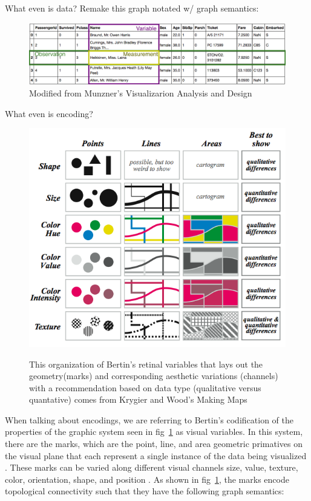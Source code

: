 \documentclass[letterpaper,onecolumn,titlepage]{Ythesis}
\begin{document}
 What even is data?
 Remake this graph notated w/ graph semantics:
 \begin{figure}
    \includegraphics{figures/intro/data_formatting}
    \caption{Modified from Munzner's Visualizarion Analysis and Design}
 \end{figure}

 What even is encoding?

 \begin{figure}
 \end{figure}
 \begin{figure}
    \includegraphics{figures/intro/retinal_variables}
    \label{fig:retinal_variable}
    \caption{This organization of Bertin's retinal variables \cite{bertinSemiologyGraphicsDiagrams2011} that lays out the geometry(marks) and corresponding aesthetic variations (channels) with a recommendation based on data type (qualitative versus quantative) comes from Krygier and Wood's Making Maps \cite{krygierMakingMapsVisual2005}}
\end{figure}

When talking about encodings, we are referring to Bertin's codification of the properties of the graphic system \cite{bertinIIPropertiesGraphic2011} seen in fig~\ref{fig:retinal_variable} as visual variables. In this system, there are the marks, which are the point, line, and area geometric primatives on the visual plane that each represent a single instance of the data being visualized \cite{bertinIIPropertiesGraphic2011,munznerMarksChannels2014}. These marks can be varied along different visual channels  size, value, texture, color, orientation, shape, and position \cite{bertinIIPropertiesGraphic2011, munznerMarksChannels2014}. As shown in fig~\ref{fig:retinal_variable}, the marks encode topological connectivity such that they have the following graph semantics:
\end{document}
